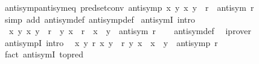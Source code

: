 \begin{isabellebody}
\isanewline
{}\isamarkupfalse%
\ antisymp{\isacharunderscore}{\kern0pt}antisym{\isacharunderscore}{\kern0pt}eq\ {\isacharbrackleft}{\kern0pt}pred{\isacharunderscore}{\kern0pt}set{\isacharunderscore}{\kern0pt}conv{\isacharbrackright}{\kern0pt}{\isacharcolon}{\kern0pt}\ {\isachardoublequoteopen}antisymp\ {\isacharparenleft}{\kern0pt}{\isasymlambda}x\ y{\isachardot}{\kern0pt}\ {\isacharparenleft}{\kern0pt}x{\isacharcomma}{\kern0pt}\ y{\isacharparenright}{\kern0pt}\ {\isasymin}\ r{\isacharparenright}{\kern0pt}\ {\isasymlongleftrightarrow}\ antisym\ r{\isachardoublequoteclose}\isanewline
%
\isadelimproof
\ \ %
\endisadelimproof
%
\isatagproof
{}\isamarkupfalse%
\ {\isacharparenleft}{\kern0pt}simp\ add{\isacharcolon}{\kern0pt}\ antisym{\isacharunderscore}{\kern0pt}def\ antisymp{\isacharunderscore}{\kern0pt}def{\isacharparenright}{\kern0pt}%
\endisatagproof
{\isafoldproof}%
%
\isadelimproof
\isanewline
%
\endisadelimproof
\isanewline
{}\isamarkupfalse%
\ antisymI\ {\isacharbrackleft}{\kern0pt}intro{\isacharquery}{\kern0pt}{\isacharbrackright}{\kern0pt}{\isacharcolon}{\kern0pt}\isanewline
\ \ {\isachardoublequoteopen}{\isacharparenleft}{\kern0pt}{\isasymAnd}x\ y{\isachardot}{\kern0pt}\ {\isacharparenleft}{\kern0pt}x{\isacharcomma}{\kern0pt}\ y{\isacharparenright}{\kern0pt}\ {\isasymin}\ r\ {\isasymLongrightarrow}\ {\isacharparenleft}{\kern0pt}y{\isacharcomma}{\kern0pt}\ x{\isacharparenright}{\kern0pt}\ {\isasymin}\ r\ {\isasymLongrightarrow}\ x\ {\isacharequal}{\kern0pt}\ y{\isacharparenright}{\kern0pt}\ {\isasymLongrightarrow}\ antisym\ r{\isachardoublequoteclose}\isanewline
%
\isadelimproof
\ \ %
\endisadelimproof
%
\isatagproof
{}\isamarkupfalse%
\ antisym{\isacharunderscore}{\kern0pt}def\ \isamarkupfalse%
\ iprover%
\endisatagproof
{\isafoldproof}%
%
\isadelimproof
\isanewline
%
\endisadelimproof
\isanewline
{}\isamarkupfalse%
\ antisympI\ {\isacharbrackleft}{\kern0pt}intro{\isacharquery}{\kern0pt}{\isacharbrackright}{\kern0pt}{\isacharcolon}{\kern0pt}\isanewline
\ \ {\isachardoublequoteopen}{\isacharparenleft}{\kern0pt}{\isasymAnd}x\ y{\isachardot}{\kern0pt}\ r\ x\ y\ {\isasymLongrightarrow}\ r\ y\ x\ {\isasymLongrightarrow}\ x\ {\isacharequal}{\kern0pt}\ y{\isacharparenright}{\kern0pt}\ {\isasymLongrightarrow}\ antisymp\ r{\isachardoublequoteclose}\isanewline
%
\isadelimproof
\ \ %
\endisadelimproof
%
\isatagproof
{}\isamarkupfalse%
\ {\isacharparenleft}{\kern0pt}fact\ antisymI\ {\isacharbrackleft}{\kern0pt}to{\isacharunderscore}{\kern0pt}pred{\isacharbrackright}{\kern0pt}{\isacharparenright}{\kern0pt}%

\end{isabellebody}
